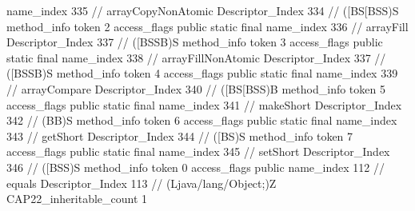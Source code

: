 {{{{{					name_index	335		// arrayCopyNonAtomic
					Descriptor_Index	334		// ([BS[BSS)S
				}
				method_info {
					token	2
					access_flags	public static final
					name_index	336		// arrayFill
					Descriptor_Index	337		// ([BSSB)S
				}
				method_info {
					token	3
					access_flags	public static final
					name_index	338		// arrayFillNonAtomic
					Descriptor_Index	337		// ([BSSB)S
				}
				method_info {
					token	4
					access_flags	public static final
					name_index	339		// arrayCompare
					Descriptor_Index	340		// ([BS[BSS)B
				}
				method_info {
					token	5
					access_flags	public static final
					name_index	341		// makeShort
					Descriptor_Index	342		// (BB)S
				}
				method_info {
					token	6
					access_flags	public static final
					name_index	343		// getShort
					Descriptor_Index	344		// ([BS)S
				}
				method_info {
					token	7
					access_flags	public static final
					name_index	345		// setShort
					Descriptor_Index	346		// ([BSS)S
				}
				method_info {
					token	0
					access_flags	public
					name_index	112		// equals
					Descriptor_Index	113		// (Ljava/lang/Object;)Z
				}
			}
			CAP22_inheritable_count	1
		}
	}
}
